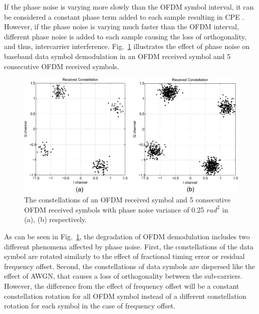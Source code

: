 If the phase noise is varying more slowly than the OFDM symbol interval, it can be considered a constant phase term added to each sample resulting in CPE \cite{Armada1998}.
However, if the phase noise is varying much faster than the OFDM interval, different phase noise is added to each sample causing the loss of orthogonality, and thus, intercarrier interference.
Fig.~\ref{fig:phasenoise} illustrates the effect of phase noise on baseband data symbol demodulation in an OFDM received symbol and 5 consecutive OFDM received symbols.
\begin{figure}
	\centerline{\includegraphics [width=0.8\columnwidth] {Figures/phasenoise.pdf} }
	\caption{The constellations of an OFDM received symbol and 5 consecutive OFDM received symbols with phase noise variance of 0.25 $rad^2$ in (a), (b) respectively.}
	\label{fig:phasenoise}
\end{figure}

As can be seen in Fig.~\ref{fig:phasenoise}, the degradation of OFDM demodulation includes two different phenomena affected by phase noise.
First, the constellations of the data symbol are rotated similarly to the effect of fractional timing error or residual frequency offset.
Second, the constellations of data symbols are dispersed like the effect of AWGN, that causes a loss of orthogonality between the sub-carriers.
However, the difference from the effect of frequency offset will be a constant constellation rotation for all OFDM symbol instead of a different constellation rotation for each symbol in the case of  frequency offset.


